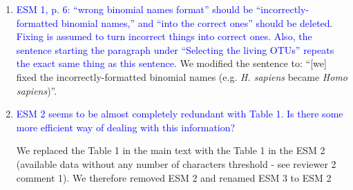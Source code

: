 \documentclass[12pt,letterpaper]{article}
\begin{document}
\begin{enumerate}
\item{\textcolor{blue}{ESM 1, p. 6: ``wrong binomial names format'' should be ``incorrectly-formatted binomial names,'' and ``into the correct ones'' should be deleted.
Fixing is assumed to turn incorrect things into correct ones.
Also, the sentence starting the paragraph under ``Selecting the living OTUs'' repeats the exact same thing as this sentence.}}
We modified the sentence to: ``[we] fixed the incorrectly-formatted binomial names (e.g. \textit{H. sapiens} became \textit{Homo sapiens})''.

\item{\textcolor{blue}{ESM 2 seems to be almost completely redundant with Table 1. Is there some more efficient way of dealing with this information?}}

We replaced the Table 1 in the main text with the Table 1 in the ESM 2 (available data without any number of characters threshold - see reviewer 2 comment 1).
We therefore removed ESM 2 and renamed ESM 3 to ESM 2

\end{enumerate}

\end{document}
